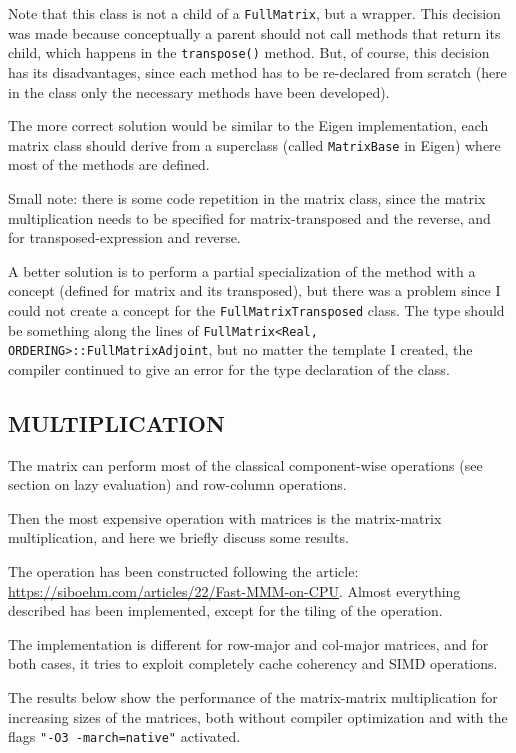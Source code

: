 \documentclass{article}
\begin{document}
Note that this class is not a child of a \texttt{FullMatrix}, but a wrapper. This decision was made because conceptually a parent should not call methods that return its child, which happens in the \texttt{transpose()} method. But, of course, this decision has its disadvantages, since each method has to be re-declared from scratch (here in the class only the necessary methods have been developed).

The more correct solution would be similar to the Eigen implementation, each matrix class should derive from a superclass (called \texttt{MatrixBase} in Eigen) where most of the methods are defined.

Small note: there is some code repetition in the matrix class, since the matrix multiplication needs to be specified for matrix-transposed and the reverse, and for transposed-expression and reverse.

A better solution is to perform a partial specialization of the method with a concept (defined for matrix and its transposed), but there was a problem since I could not create a concept for the \texttt{FullMatrixTransposed} class. The type should be something along the lines of \texttt{FullMatrix<Real, ORDERING>::FullMatrixAdjoint}, but no matter the template I created, the compiler continued to give an error for the type declaration of the class.

\subsection{MULTIPLICATION}

The matrix can perform most of the classical component-wise operations (see section on lazy evaluation) and row-column operations.

Then the most expensive operation with matrices is the matrix-matrix multiplication, and here we briefly discuss some results.

The operation has been constructed following the article: \url{https://siboehm.com/articles/22/Fast-MMM-on-CPU}. Almost everything described has been implemented, except for the tiling of the operation.

The implementation is different for row-major and col-major matrices, and for both cases, it tries to exploit completely cache coherency and SIMD operations.

The results below show the performance of the matrix-matrix multiplication for increasing sizes of the matrices, both without compiler optimization and with the flags \texttt{"-O3 -march=native"} activated.
\end{document}
